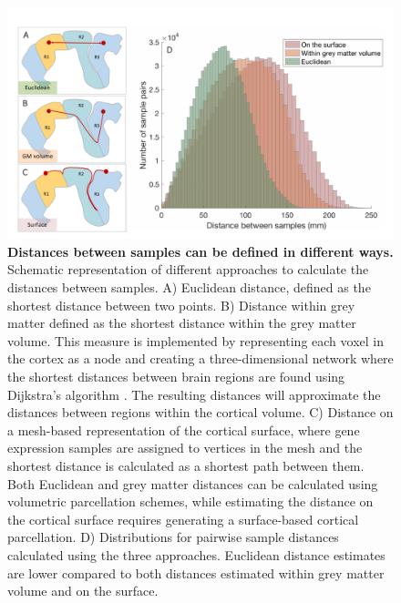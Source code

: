 \begin{figure}[h!]
  \centering
    \includegraphics[width=1\textwidth]{Chapter4/Ch4Fig7.pdf}
\caption{\textbf{Distances between samples can be defined in different ways.}
Schematic representation of different approaches to calculate the distances between samples.
A) Euclidean distance, defined as the shortest distance between two points.
B) Distance within grey matter defined as the shortest distance within the grey matter volume. This measure is implemented by representing each voxel in the cortex as a node and creating a three-dimensional network where the shortest distances between brain regions are found using Dijkstra's algorithm \citep{Dijkstra1959}. The resulting distances will approximate the distances between regions within the cortical volume.
C) Distance on a mesh-based representation of the cortical surface, where gene expression samples are assigned to vertices in the mesh and the shortest distance is calculated as a shortest path between them. Both Euclidean and grey matter distances can be calculated using volumetric parcellation schemes, while estimating the distance on the cortical surface requires generating a surface-based cortical parcellation.
D) Distributions for pairwise sample distances calculated using the three approaches. Euclidean distance estimates are lower compared to both distances estimated within grey matter volume and on the surface. }
\label{fig:Ch4Fig7}
\end{figure}

